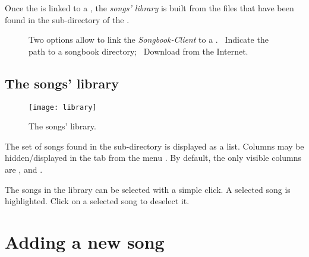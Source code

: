 Once the \client is linked to a \songbook, the \emph{songs'
  library} is built from the  files that have been found in
the  sub-directory of the \songbook.


\begin{figure}
  \centering
  \hspace{0.1cm}%
  \caption{%
    Two options allow to link the \emph{Songbook-Client} to a \songbook.
    ~Indicate the path to a songbook directory;%
    ~Download from the Internet.%
  }%
  \label{fig:solutions}
\end{figure}


\subsection{The songs' library}

\begin{figure}
  \centering
  \texttt{[image: library]}
  \caption{The songs' library.}
  \label{fig:library}
\end{figure}

The set of  songs found in the  sub-directory
is displayed as a list. Columns may be hidden/displayed in the tab
 from the menu . By
default, the only visible columns are ,  and
.

The songs in the library can be selected with a simple click.  A
selected song is highlighted. Click on a selected song to deselect it.

\section{Adding a new song}

